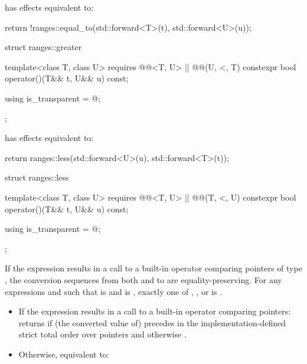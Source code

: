 \begin{itemdescr}
\pnum
{} has effects equivalent to:
\begin{codeblock}
return !ranges::equal_to{}(std::forward<T>(t), std::forward<U>(u));
\end{codeblock}
\end{itemdescr}

%
\begin{itemdecl}
struct ranges::greater {
  template<class T, class U>
    requires @@<T, U> || @@(U, <, T)
  constexpr bool operator()(T&& t, U&& u) const;

  using is_transparent = @\unspecnc@;
};
\end{itemdecl}

\begin{itemdescr}
\pnum
{} has effects equivalent to:
\begin{codeblock}
return ranges::less{}(std::forward<U>(u), std::forward<T>(t));
\end{codeblock}
\end{itemdescr}

%
\begin{itemdecl}
struct ranges::less {
  template<class T, class U>
    requires @@<T, U> || @@(T, <, U)
  constexpr bool operator()(T&& t, U&& u) const;

  using is_transparent = @\unspecnc@;
};
\end{itemdecl}

\begin{itemdescr}
\pnum
\expects
If the expression  results in a
call to a built-in operator \tcode{<} comparing pointers of type , the
conversion sequences from both  and  to  are
equality-preserving. For any expressions
 and  such that  is  and
 is , exactly one of
,
, or
is .

\pnum
\effects
\begin{itemize}
\item
If the expression  results in a
call to a built-in operator \tcode{<} comparing pointers:
returns  if (the converted value of)  precedes  in
the implementation-defined strict total order over pointers
and otherwise .

\item
Otherwise, equivalent to:
\end{itemize}
\end{itemdescr}

